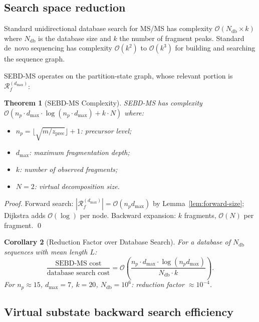 \documentclass[twocolumn,10pt,a4paper]{article}
\theoremstyle{thmstyle}
\newtheorem{theorem}{Theorem}[section]
\newtheorem{corollary}[theorem]{Corollary}
\theoremstyle{definition}
\theoremstyle{remark}
\newcommand{\Reachf}{\mathcal{R}_f}
\begin{document}
\subsection{Search space reduction}

Standard unidirectional database search for MS/MS has complexity
$\mathcal{O}(N_\text{db} \times k)$ where $N_\text{db}$ is the database
size and $k$ the number of fragment peaks. Standard de~novo sequencing
has complexity $\mathcal{O}(k^2)$ to $\mathcal{O}(k^3)$ for building
and searching the sequence graph.

SEBD-MS operates on the partition-state graph, whose relevant portion is
$\Reachf^{(d_\text{max})}$:

\begin{theorem}[SEBD-MS Complexity]
\label{thm:complexity}
SEBD-MS has complexity $\mathcal{O}(n_p \cdot d_\text{max} \cdot
\log(n_p \cdot d_\text{max}) + k \cdot N)$ where:
\begin{itemize}[nosep]
\item $n_p = \lfloor\sqrt{m/z_\text{prec}}\rfloor + 1$: precursor level;
\item $d_\text{max}$: maximum fragmentation depth;
\item $k$: number of observed fragments;
\item $N = 2$: virtual decomposition size.
\end{itemize}
\end{theorem}

\begin{proof}
Forward search: $|\Reachf^{(d_\text{max})}| = \mathcal{O}(n_p d_\text{max})$
by Lemma~\ref{lem:forward-size}; Dijkstra adds $\mathcal{O}(\log)$ per
node. Backward expansion: $k$ fragments, $\mathcal{O}(N)$ per fragment.
\qed
\end{proof}

\begin{corollary}[Reduction Factor over Database Search]
\label{cor:reduction}
For a database of $N_\text{db}$ sequences with mean length $L$:
\begin{equation}
\frac{\text{SEBD-MS cost}}{\text{database search cost}}
= \mathcal{O}\!\left(\frac{n_p \cdot d_\text{max} \cdot
\log(n_p d_\text{max})}{N_\text{db} \cdot k}\right).
\end{equation}
For $n_p \approx 15$, $d_\text{max} = 7$, $k = 20$, $N_\text{db} = 10^6$:
reduction factor $\approx 10^{-4}$.
\end{corollary}

\subsection{Virtual substate backward search efficiency}
\end{document}

